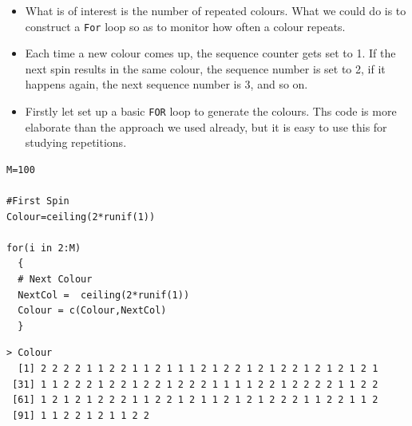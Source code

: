 \documentclass[11pt]{article} %
\begin{document}
\begin{itemize}
\item What is of interest is the number of repeated colours. What we could do is to construct a \texttt{For} loop so as to monitor how often a colour repeats.

\item Each time a new colour comes up, the sequence counter gets set to 1. If the next spin results in the same colour, the sequence number is set to 2, if it happens again, the next sequence number is 3, and so on.

\item Firstly let set up a basic \texttt{FOR} loop to generate the colours. Ths code is more elaborate than the approach we used already, but it is easy to use this for studying repetitions.
\end{itemize}

\begin{framed}
\begin{verbatim}
M=100

#First Spin
Colour=ceiling(2*runif(1))

for(i in 2:M)
  {
  # Next Colour
  NextCol =  ceiling(2*runif(1))
  Colour = c(Colour,NextCol)
  }
\end{verbatim}
\end{framed}
\begin{verbatim}
> Colour
  [1] 2 2 2 2 1 1 2 2 1 1 2 1 1 1 2 1 2 2 1 2 1 2 2 1 2 1 2 1 2 1
 [31] 1 1 2 2 2 1 2 2 1 2 2 1 2 2 2 1 1 1 1 2 2 1 2 2 2 2 1 1 2 2
 [61] 1 2 1 2 1 2 2 2 1 1 2 2 1 2 1 1 2 1 2 1 2 2 2 1 1 2 2 1 1 2
 [91] 1 1 2 2 1 2 1 1 2 2
\end{verbatim}
\end{document}
